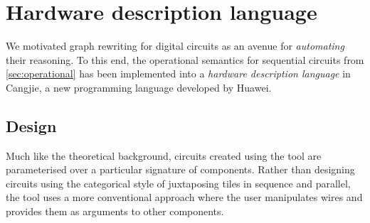 \section{Hardware description language}

We motivated graph rewriting for digital circuits as an avenue for
\emph{automating} their reasoning.
To this end, the operational semantics for sequential circuits from
\cref{sec:operational} has been implemented into a
\emph{hardware description language} in Cangjie, a new programming
language developed by Huawei.


\subsection{Design}

Much like the theoretical background, circuits created using the tool are
parameterised over a particular signature of components.
Rather than designing circuits using the categorical style of juxtaposing
tiles in sequence and parallel, the tool uses a more conventional approach
where the user manipulates wires and provides them as arguments to other
components.

